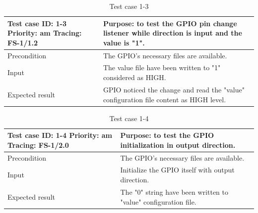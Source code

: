 \begin{table}[H]
	\caption{Test case 1-3}
	\label{table:TCase-FS1-3}
	\begin{center}
		\renewcommand{\arraystretch}{1.8}
		\begin{tabu} 
			to 0.9 \textwidth
			{  X[0.4, c] X[c] }
			\toprule
			Test case ID: 1-3 \newline Priority: am \newline Tracing: FS-1/1.2 & Purpose: to test the GPIO pin change listener while direction is input and the value is "1". \\ \midrule
			Precondition                                                       & The GPIO's necessary files are available.                                                    \\
			Input                                                              & The value file have been written to "1" considered as HIGH.                                 \\
			Expected result                                                    & GPIO noticed the change and read the "value" configuration file content as HIGH level.      \\ \bottomrule
		\end{tabu}
	\end{center}
\end{table} 

\begin{table}[H]
	\caption{Test case 1-4}
	\label{table:TCase-FS1-4}
	\begin{center}
		\renewcommand{\arraystretch}{1.8}
		\begin{tabu} 
			to 0.9 \textwidth
			{  X[0.4, c] X[c] }
			\toprule
			Test case ID: 1-4 \newline Priority: am \newline Tracing: FS-1/2.0 & Purpose: to test the GPIO initialization in output direction.   \\ \midrule
			Precondition                                                       & The GPIO's necessary files are available.                        \\
			Input                                                              & Initialize the GPIO itself with output direction.               \\
			Expected result                                                    & The "0" string have been written to "value" configuration file. \\ \bottomrule
		\end{tabu}
	\end{center}
\end{table} 

